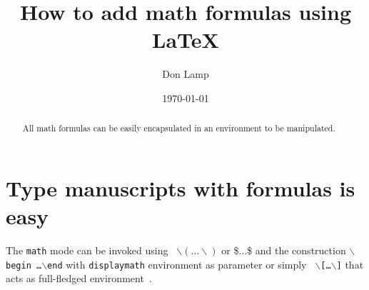 \documentclass[a4paper, 10pt]{article}
\begin{document}
\author{Don Lamp}
\title{How to add math formulas using \LaTeX }
\date{\today}
\maketitle

\begin{abstract}
  All math formulas can be easily encapsulated in an environment to be
  manipulated.
\end{abstract}

\section{Type manuscripts with formulas is easy}

The {\tt math} mode can be invoked using {\tt
  $\backslash(\ldots\backslash)$} or \$$\ldots$\$ and the construction
{\tt $\backslash$begin \ldots$\backslash$end} with {\tt displaymath}
environment as parameter or simply {\tt
  $\backslash$[\ldots$\backslash$]} that acts as full-fledged
environment~\cite{latexbook}.

\end{document}
